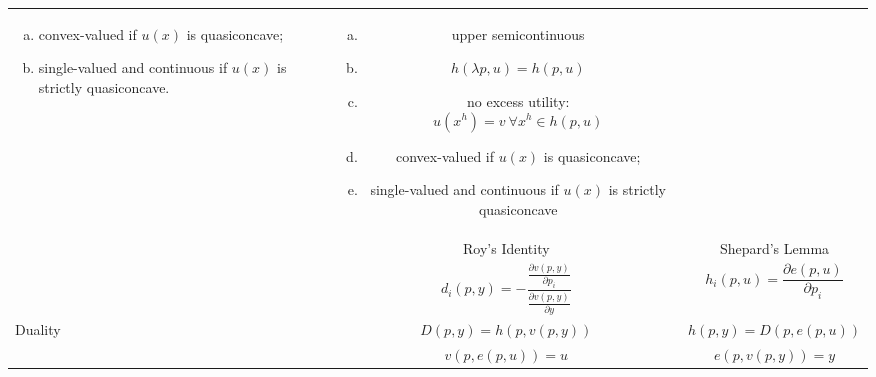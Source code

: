 \documentclass{article}
\begin{document}
\begin{table}
\begin{tabular}{lcc}
{\begin{enumerate}[(a)]
                \item convex-valued if $u(x)$ is quasiconcave;
                \item single-valued and continuous if
                      $u(x)$ is strictly quasiconcave.
              \end{enumerate}
          }
          & \parbox{.35\textwidth}{
              \begin{enumerate}[(a)]
                \item upper semicontinuous
                \item $h(\lambda p,u) = h(p,u)$
                \item no excess utility:
                      $$u(x^h) = v\ \forall x^h \in h(p,u)$$
                \item convex-valued if $u(x)$ is quasiconcave;
                \item single-valued and continuous if
                      $u(x)$ is strictly quasiconcave
              \end{enumerate}
          }
      \\
         & Roy's Identity & Shepard's Lemma
      \\
         & \parbox{.35\textwidth}{
             $$d_i(p,y) = - \frac{\frac{\partial v(p,y)}{\partial p_i}}
                                {\frac{\partial v(p,y)}{\partial y}}$$
         }
         & \parbox{.35\textwidth}{
            $$h_i(p,u) = \frac{\partial e(p,u)}{\partial p_i}$$
         }
      \\\hline
      Duality
      & $D(p,y)=h(p,v(p,y))$ & $h(p,y)=D(p,e(p,u))$
      \\
      & $v(p,e(p,u))=u$ & $e(p,v(p,y))=y$
      \\
    \hline\hline
  \end{tabular}
\end{table}
\end{document}
